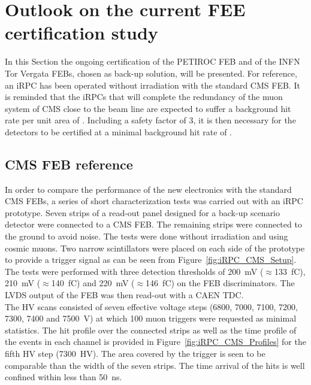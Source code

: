 	\section{Outlook on the current FEE certification study}
	\label{chapt6:sec:outlooks}
	
	In this Section the ongoing certification of the PETIROC FEB and of the INFN Tor Vergata FEBs, chosen as back-up solution, will be presented. For reference, an iRPC has been operated without irradiation with the standard CMS FEB. It is reminded that the iRPCs that will complete the redundancy of the muon system of CMS close to the beam line are expected to suffer a background hit rate per unit area of . Including a safety factor of 3, it is then necessary for the detectors to be certified at a minimal background hit rate of .
	
		\subsection{CMS \acl{FEB} reference}
		\label{chapt6:ssec:CMSFEBref}
    
    In order to compare the performance of the new electronics with the standard CMS FEBs, a series of short characterization tests was carried out with an iRPC prototype. Seven strips of a read-out panel designed for a back-up scenario detector were connected to a CMS FEB. The remaining strips were connected to the ground to avoid noise. The tests were done without irradiation and using cosmic muons. Two narrow scintillators were placed on each side of the prototype to provide a trigger signal as can be seen from Figure~\ref{fig:iRPC_CMS_Setup}. The tests were performed with three detection thresholds of \SI{200}{mV} ($\approx$\SI{133}{fC}), \SI{210}{mV} ($\approx$\SI{140}{fC}) and \SI{220}{mV} ($\approx$\SI{146}{fC}) on the FEB discriminators. The LVDS output of the FEB was then read-out with a CAEN TDC.\\
    The HV scans consisted of seven effective voltage steps (6800, 7000, 7100, 7200, 7300, 7400 and \SI{7500}{V}) at which 100 muon triggers were requested as minimal statistics. The hit profile over the connected strips as well as the time profile of the events in each channel is provided in Figure~\ref{fig:iRPC_CMS_Profiles} for the fifth HV step (\SI{7300}{HV}). The area covered by the trigger is seen to be comparable than the width of the seven strips. The time arrival of the hits is well confined within less than \SI{50}{ns}.
		
